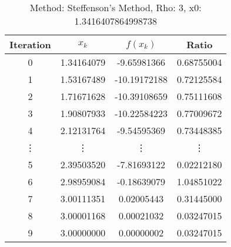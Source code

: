 \begin{table}
\centering
\caption{Method: Steffenson's Method, Rho: 3, x0: 1.3416407864998738}
\label{tab:table_Steffenson's_Method_3_1_3416407864998738}
\begin{tabular}{c c c c}
\toprule
Iteration &      $x_k$ &     $f(x_k)$ &      Ratio \\
\midrule
        0 & 1.34164079 &  -9.65981366 & 0.68755004 \\
        1 & 1.53167489 & -10.19172188 & 0.72125584 \\
        2 & 1.71671628 & -10.39108659 & 0.75111608 \\
        3 & 1.90807933 & -10.22584223 & 0.77009672 \\
        4 & 2.12131764 &  -9.54595369 & 0.73448385 \\
   \vdots &     \vdots &       \vdots &     \vdots \\
        5 & 2.39503520 &  -7.81693122 & 0.02212180 \\
        6 & 2.98959084 &  -0.18639079 & 1.04851022 \\
        7 & 3.00111351 &   0.02005443 & 0.31445000 \\
        8 & 3.00001168 &   0.00021032 & 0.03247015 \\
        9 & 3.00000000 &   0.00000002 & 0.03247015 \\
\bottomrule
\end{tabular}
\end{table}
